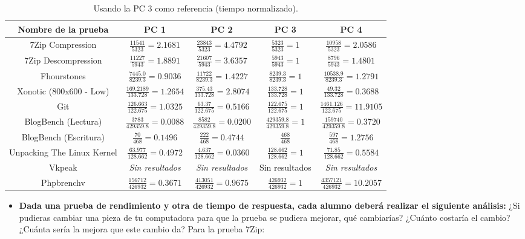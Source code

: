\documentclass[12pt]{article}
\begin{document}
\begin{enumerate}[label=(\arabic{section}.\arabic{subsection}.\arabic{enumi})]
    \begin{table}[htb]
       \centering
        \begin{tabular}{|c|c|c|c|c|}
        \hline
        \textbf{Nombre de la prueba} & \textbf{PC 1} & \textbf{PC 2} & \textbf{PC 3} & \textbf{PC 4}\\
        \hline
        7Zip Compression & $\frac{11541}{5323}=2.1681$ & $\frac{23843}{5323}=4.4792$ & $\frac{5323}{5323}=1$ & $\frac{10958}{5323}=2.0586$ \\
        \hline
        7Zip Descompression& $\frac{11227}{5943}=1.8891$ & $\frac{21607}{5943}=3.6357$ & $\frac{5943}{5943}=1$ &  $\frac{8796}{5943}=1.4801$ \\
        \hline
        Fhourstones & $\frac{7445.0}{8239.3}=0.9036$ & $\frac{11722}{8239.3}=1.4227$ & $\frac{8239.3}{8239.3}=1$ & $\frac{10538.9}{8239.3}=1.2791$ \\
        \hline
        Xonotic (800x600 - Low) & $\frac{169.2189}{133.728}=1.2654$ & $\frac{375.43}{133.728}=2.8074$ & $\frac{133.728}{133.728}=1$ & $\frac{49.32}{133.728}=0.3688$ \\
        \hline
        Git & $\frac{126.663}{122.675}=1.0325$ & $\frac{63.37}{122.675}=0.5166$ & $\frac{122.675}{122.675}=1$ & $\frac{1461.126}{122.675}=11.9105$ \\
        \hline
        BlogBench (Lectura) & $\frac{3783}{429359.8}=0.0088$ & $\frac{8582}{429359.8}=0.0200$ & $\frac{429359.8}{429359.8}=1$ & $\frac{159740}{429359.8}=0.3720$ \\
        \hline
        BlogBench (Escritura) & $\frac{70}{468}=0.1496$ & $\frac{222}{468}=0.4744$ & $\frac{468}{468}$ & $\frac{597}{468}=1.2756$ \\
        \hline
        Unpacking The Linux Kernel & $\frac{63.977}{128.662}=0.4972$ & $\frac{4.637}{128.662}=0.0360$ & $\frac{128.662}{128.662}=1$ & $\frac{71.85}{128.662}=0.5584$ \\
        \hline
        Vkpeak & \textit{Sin resultados} & \textit{Sin resultados} & Sin resultados & \textit{Sin resultados} \\
        \hline
        Phpbrenchv & $\frac{156712}{426932}=0.3671$ & $\frac{413051}{426932}=0.9675$ & $\frac{426932}{426932}=1$ & $\frac{4357121}{426932}=10.2057$ \\
        \hline
        \end{tabular}
        \caption{Usando la PC 3 como referencia (tiempo normalizado).}
    \end{table}

    \begin{itemize}
    	\item \textbf{Dada una prueba de rendimiento y otra de tiempo de respuesta, cada alumno deberá realizar el siguiente análisis:} ¿Si pudieras cambiar una pieza de tu computadora para que la prueba se pudiera mejorar, qué cambiarías? ¿Cuánto costaría el cambio? ¿Cuánta sería la mejora que este cambio da? Para la prueba 7Zip:
    	

\end{itemize}
\end{enumerate}
\end{document}
